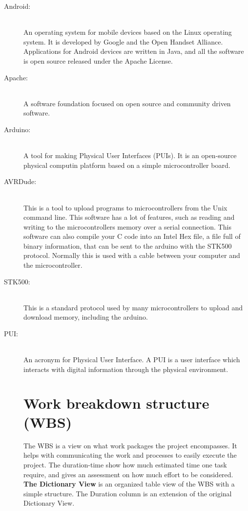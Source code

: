 \begin{description}

\item[Android:]\hfill \\
An operating system for mobile devices based on the Linux operating system. It is developed by Google and the Open Handset Alliance. Applications for Android devices are written in Java, and all the software is open source released under the Apache License.

\item[Apache:] \hfill \\
A software foundation focused on open source and community driven software.

\item[Arduino:]\hfill \\
A tool for making Physical User Interfaces (PUIs). It is an open-source physical computin platform based on a simple microcontroller board.

\item[AVRDude:]\hfill \\
This is a tool to upload programs to microcontrollers from the Unix command line. This software has a lot of features, such as reading and writing to the microcontrollers memory over a serial connection. This software can also compile your C code into an Intel Hex file, a file full of binary information, that can be sent to the arduino with the STK500 protocol. Normally this is used with a cable between your computer and the microcontroller.

\item[STK500:]\hfill \\
This is a standard protocol used by many microcontrollers to upload and download memory, including the arduino.

\item[PUI:]\hfill \\
An acronym for Physical User Interface. A PUI is a user interface which interacts with digital information through the physical environment.

\section{Work breakdown structure (WBS)}
The WBS is a view on what work packages the project encompasses. It helps with communicating the work and processes to easily execute the project. The duration-time show how much estimated time one task require, and gives an assessment on how much effort to be considered.\\
\newline
\textbf{The Dictionary View} is an organized table view of the WBS with a simple structure. The Duration column is an extension of the original Dictionary View.\\


\end{description}
